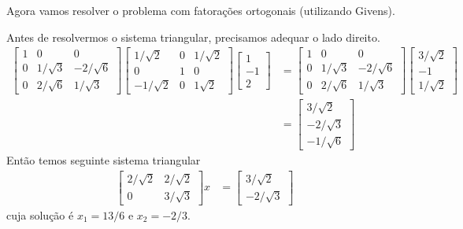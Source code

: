 \begin{questions}
\begin{parts}
\begin{solution}
            Agora vamos resolver o problema com fatora\c{c}\~{o}es ortogonais (utilizando Givens).

            Antes de resolvermos o sistema triangular, precisamos adequar o lado direito.
            \begin{align*}
                \begin{bmatrix}
                    1 & 0 & 0 \\
                    0 & 1 / \sqrt{3} & -2 / \sqrt{6} \\
                    0 & 2 / \sqrt{6} & 1 / \sqrt{3}
                \end{bmatrix} \begin{bmatrix}
                    1 / \sqrt{2} & 0 & 1 / \sqrt{2} \\
                    0 & 1 & 0 \\
                    - 1 / \sqrt{2} & 0 & 1 \sqrt{2}
                \end{bmatrix} \begin{bmatrix}
                    1 \\
                    -1 \\
                    2
                \end{bmatrix} &= \begin{bmatrix}
                    1 & 0 & 0 \\
                    0 & 1 / \sqrt{3} & -2 / \sqrt{6} \\
                    0 & 2 / \sqrt{6} & 1 / \sqrt{3}
                \end{bmatrix} \begin{bmatrix}
                    3 / \sqrt{2}  \\
                    -1 \\
                    1 / \sqrt{2}
                \end{bmatrix} \\
                &= \begin{bmatrix}
                    3 / \sqrt{2}  \\
                    -2 / \sqrt{3} \\
                    - 1 / \sqrt{6}
                \end{bmatrix} 
            \end{align*}
            Ent\~{a}o temos seguinte sistema triangular
            \begin{align*}
                \begin{bmatrix}
                    2 / \sqrt{2} & 2 / \sqrt{2} \\
                    0 & 3 / \sqrt{3}
                \end{bmatrix} x &= \begin{bmatrix}
                    3 / \sqrt{2} \\
                    -2 / \sqrt{3}
                \end{bmatrix}
            \end{align*}
            cuja solu\c{c}\~{a}o \'{e} $x_1 = 13 / 6$ e $x_2 = -2 / 3$.
        \end{solution}
    \end{parts}


\end{questions}

